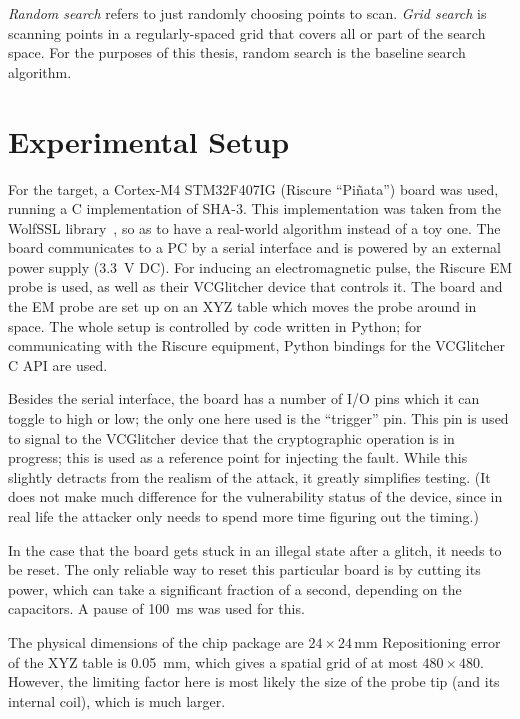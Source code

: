 \documentclass[times, utf8, diplomski]{fer}
\begin{document}
\emph{Random search} refers to just randomly choosing points to scan.
\emph{Grid search} is scanning points in a regularly-spaced grid that covers all
or part of the search space.
For the purposes of this thesis, random search is the baseline search algorithm.


\section{Experimental Setup}\label{sec:setup}
For the target, a Cortex-M4 STM32F407IG (Riscure ``Pi\~{n}ata'') board was used,
running a C implementation of SHA-3. This implementation was taken from the WolfSSL
library~\cite{WolfSSL}, so as to have a real-world algorithm instead of a toy one.
The board communicates to a PC by a serial interface and is powered by an external
power supply (\SI{3.3}{\volt} DC). For inducing an electromagnetic pulse, the
Riscure EM probe is used, as well as their VCGlitcher device that controls it.
The board and the EM probe are set up on an XYZ table which moves the probe
around in space. The whole setup is controlled by code written in Python; for
communicating with the Riscure equipment, Python bindings for the VCGlitcher
C API are used.\footnotemark


Besides the serial interface, the board has a number of I/O pins which it can
toggle to high or low; the only one here used is the ``trigger'' pin. This pin is
used to signal to the VCGlitcher device that the cryptographic operation is in
progress; this is used as a reference point for injecting the fault. While this
slightly detracts from the realism of the attack, it greatly simplifies testing.
(It does not make much difference for the vulnerability status of the device,
since in real life the attacker only needs to spend more time figuring out the
timing.)

In the case that the board gets stuck in an illegal state after a glitch, it
needs to be reset. The only reliable way to reset this particular board is by
cutting its power, which can take a significant fraction of a second, depending
on the capacitors. A pause of \SI{100}{\milli\second} was used for this.

The physical dimensions of the chip package are $24 \times 24$\,\si{\milli\metre}
Repositioning error of the XYZ table is \SI{0.05}{\milli\metre}, which gives
a spatial grid of at most $480 \times 480$. However, the limiting factor here
is most likely the size of the probe tip (and its internal coil), which is much
larger.
\end{document}
